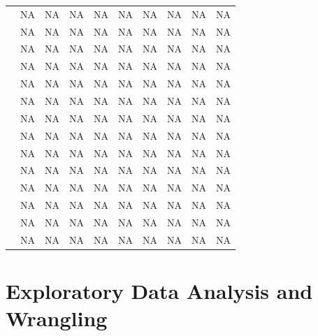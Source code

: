 \documentclass[12pt,]{article}
\begin{document}
\begin{tabular}{lrrrrrrrrr}
 & NA & NA & NA & NA & NA & NA & NA & NA & NA\\
\addlinespace
 & NA & NA & NA & NA & NA & NA & NA & NA & NA\\
 & NA & NA & NA & NA & NA & NA & NA & NA & NA\\
 & NA & NA & NA & NA & NA & NA & NA & NA & NA\\
 & NA & NA & NA & NA & NA & NA & NA & NA & NA\\
 & NA & NA & NA & NA & NA & NA & NA & NA & NA\\
\addlinespace
 & NA & NA & NA & NA & NA & NA & NA & NA & NA\\
 & NA & NA & NA & NA & NA & NA & NA & NA & NA\\
 & NA & NA & NA & NA & NA & NA & NA & NA & NA\\
 & NA & NA & NA & NA & NA & NA & NA & NA & NA\\
 & NA & NA & NA & NA & NA & NA & NA & NA & NA\\
\addlinespace
 & NA & NA & NA & NA & NA & NA & NA & NA & NA\\
 & NA & NA & NA & NA & NA & NA & NA & NA & NA\\
 & NA & NA & NA & NA & NA & NA & NA & NA & NA\\
\bottomrule
\end{tabular}

\newpage

\section{Exploratory Data Analysis and
Wrangling}\label{exploratory-data-analysis-and-wrangling}
\end{document}
